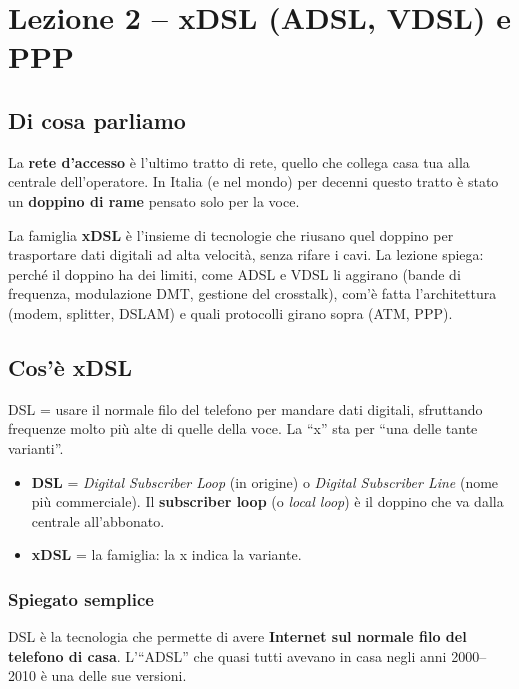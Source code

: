 \chapter{Lezione 2 -- xDSL (ADSL, VDSL) e PPP}

\section{Di cosa parliamo}

La \textbf{rete d'accesso} è l'ultimo tratto di rete, quello che collega casa tua alla centrale dell'operatore. In Italia (e nel mondo) per decenni questo tratto è stato un \textbf{doppino di rame} pensato solo per la voce.

La famiglia \textbf{xDSL} è l'insieme di tecnologie che riusano quel doppino per trasportare dati digitali ad alta velocità, senza rifare i cavi. La lezione spiega: perché il doppino ha dei limiti, come ADSL e VDSL li aggirano (bande di frequenza, modulazione DMT, gestione del crosstalk), com'è fatta l'architettura (modem, splitter, DSLAM) e quali protocolli girano sopra (ATM, PPP).

\section{Cos'è xDSL}

\begin{inbreve}

DSL = usare il normale filo del telefono per mandare dati digitali, sfruttando frequenze molto più alte di quelle della voce. La ``x'' sta per ``una delle tante varianti''.

\end{inbreve}

\begin{itemize}
\tightlist
\item
  \textbf{DSL} = \emph{Digital Subscriber Loop} (in origine) o \emph{Digital Subscriber Line} (nome più commerciale). Il \textbf{subscriber loop} (o \emph{local loop}) è il doppino che va dalla centrale all'abbonato.
\item
  \textbf{xDSL} = la famiglia: la x indica la variante.
\end{itemize}

\subsection{Spiegato semplice}

DSL è la tecnologia che permette di avere \textbf{Internet sul normale filo del telefono di casa}. L'``ADSL'' che quasi tutti avevano in casa negli anni 2000--2010 è una delle sue versioni.

